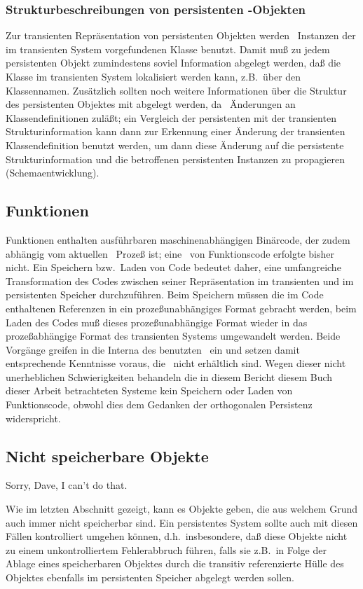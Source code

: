 \subsubsection{Strukturbeschreibungen von persistenten
\protect\clos-Objekten}%
%
Zur transienten Repr\"{a}sentation von persistenten Objekten werden
\ia\ Instanzen der im transienten System vorgefundenen Klasse
benutzt.  Damit mu\ss{} zu jedem persistenten Objekt zumindestens soviel
Information abgelegt werden, da\ss{} die Klasse im transienten
System lokalisiert werden kann, z.B.\ \"{u}ber den Klassennamen.
Zus\"{a}tzlich sollten noch weitere Informationen \"{u}ber die
Struktur des persistenten Objektes mit abgelegt werden, da
\clos\ \"{A}nderungen an Klassendefinitionen zul\"{a}\ss{}t; ein Vergleich der
persistenten mit der transienten Strukturinformation kann dann zur
Erkennung einer \"{A}nderung der transienten Klassendefinition benutzt
werden, um dann diese \"{A}nderung auf die persistente
Strukturinformation und die betroffenen persistenten Instanzen zu
propagieren (Schemaentwicklung).
%
\subsection{Funktionen}%
\label{sec:fnmtd}%
%
Funktionen enthalten ausf\"{u}hrbaren maschinenabh\"{a}ngigen
Bin\"{a}rcode, der zudem ab\-h\"{a}n\-gig vom aktuellen \cl\ 
Proze\ss{} ist; eine \std[isierung]\ von Funktionscode erfolgte bisher
nicht. Ein Speichern bzw.\ Laden von Code bedeutet daher, eine
umfangreiche Transformation des Codes zwischen seiner
Repr\"{a}sentation im transienten und im persistenten Speicher
durchzuf\"{u}hren. Beim Speichern m\"{u}ssen die im Code enthaltenen
Referenzen in ein pro\-ze\ss{}\-un\-ab\-h\"{a}n\-gi\-ges Format
gebracht werden, beim Laden des Codes mu\ss{} dieses
proze\ss{}unabh\"{a}ngige Format wieder in das proze\ss{}abh\"{a}ngige
Format des transienten Systems umgewandelt werden. Beide
Vor\-g\"{a}n\-ge greifen in die Interna des benutzten \cl\ ein und
setzen damit entsprechende Kenntnisse voraus, die \ia\ nicht
erh\"{a}ltlich sind. Wegen dieser nicht unerheblichen Schwierigkeiten
behandeln die in \ifbericht diesem Bericht \else\ifbuch diesem Buch
\else dieser Arbeit \fi\fi betrachteten Systeme kein Speichern oder
Laden von Funktionscode, obwohl dies dem Gedanken der orthogonalen
Persistenz widerspricht.
%
\subsection{Nicht speicherbare Objekte}
%
\begin{fortune}[6cm]
Sorry, Dave, I can't do that.
\end{fortune}
%
Wie im letzten Abschnitt gezeigt, kann es Objekte geben, die aus
welchem Grund auch immer nicht speicherbar sind. Ein persistentes
System sollte auch mit diesen F\"{a}llen kontrolliert umgehen k\"{o}nnen,
d.h.\ insbesondere, da\ss{} diese Objekte nicht zu einem unkontrolliertem
Fehlerabbruch f\"{u}hren, falls sie z.B.\ in Folge der Ablage eines
speicherbaren Objektes durch die transitiv referenzierte H\"{u}lle des
Objektes ebenfalls im persistenten Speicher abgelegt werden sollen.
%
